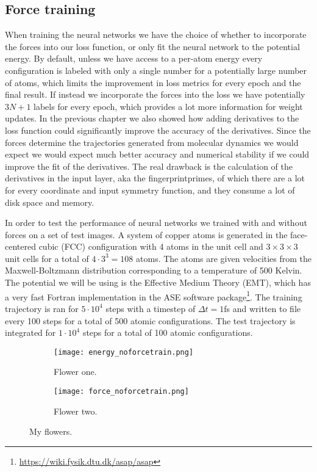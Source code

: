 \subsection{Force training}
When training the neural networks we have the choice of whether
to incorporate the forces into our loss function, or only fit
the neural network to the potential energy. By default, unless
we have access to a per-atom energy every configuration is labeled
with only a single number for a potentially large number of atoms,
which limits the improvement in loss metrics for every epoch
and the final result. If instead we incorporate the forces into the
loss we have potentially $3N + 1$ labels for every epoch,
which provides a lot more information for weight updates.
In the previous chapter we also showed how adding derivatives to
the loss function could significantly improve the accuracy of the
derivatives. Since the forces determine the trajectories generated
from molecular dynamics we would expect we would expect much better
accuracy and numerical stability if we could improve the fit of
the derivatives.
The real drawback is the calculation of the derivatives in the input layer,
aka the fingerprintprimes, of which there are a lot for every coordinate
and input symmetry function, and they consume a lot of disk space and memory.
\par
In order to test the performance of neural networks
we trained with and without forces on a set of test images.
A system of copper atoms is generated in the face-centered cubic (FCC)
configuration with 4 atoms in the unit cell and $3 \times 3 \times 3$
unit cells for a total of $4 \cdot 3^3 = 108$ atoms. The
atoms are given velocities from the Maxwell-Boltzmann distribution
corresponding to a temperature of 500 Kelvin. The potential we will
be using is the Effective Medium Theory (EMT), which has a very
fast Fortran implementation in the ASE software package\footnote{
\url{https://wiki.fysik.dtu.dk/asap/asap}}.
The training trajectory is ran for $5 \cdot 10^4$ steps with
a timestep of $\Delta t = 1$fs and written to file every 100 steps
for a total of 500 atomic configurations. The test trajectory is
integrated for $1 \cdot 10^4$ steps for a total of 100 atomic configurations.

\begin{figure}[!tbp]
\begin{adjustbox}{max width=1.2\linewidth,center}
\centering
  \begin{subfigure}[b]{0.55\textwidth}
      \texttt{[image: energy\_noforcetrain.png]}
    \caption{Flower one.}
    \label{fig:f1}
  \end{subfigure}
  \hfill
  \begin{subfigure}[b]{0.55\textwidth}
      \texttt{[image: force\_noforcetrain.png]}
    \caption{Flower two.}
    \label{fig:f2}
  \end{subfigure}
\end{adjustbox}
\caption{My flowers.}
    \label{fig:noforcetrain}
\end{figure}

